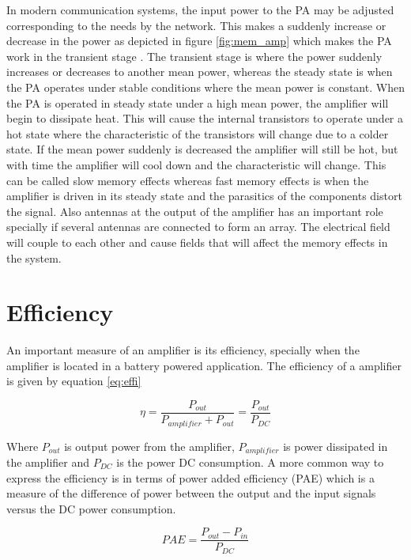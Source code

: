 In modern communication systems, the input power to the PA may be adjusted corresponding to the needs by the network. This makes a suddenly increase or decrease in the power as depicted in figure \ref{fig:mem_amp} which makes the PA work in the transient stage \citep{guo2015} \citep{liu2007}. The transient stage is where the power suddenly increases or decreases to another mean power, whereas the steady state is when the PA operates under stable conditions where the mean power is constant. When the PA is operated in steady state under a high mean power, the amplifier will begin to dissipate heat. This will cause the internal transistors to operate under a hot state where the characteristic of the transistors will change due to a colder state. If the mean power suddenly is decreased the amplifier will still be hot, but with time the amplifier will cool down and the characteristic will change. This can be called slow memory effects whereas fast memory effects is when the amplifier is driven in its steady state and the parasitics of the components distort the signal. Also antennas at the output of the amplifier has an important role specially if several antennas are connected to form an array. The electrical field will couple to each other and cause fields that will affect the memory effects in the system. 


\section{Efficiency}
An important measure of an amplifier is its efficiency, specially when the amplifier is located in a battery powered application. The efficiency of a amplifier is given by equation \ref{eq:effi}

\begin{equation} \label{eq:effi}
\eta = \frac{P_{out}}{P_{amplifier}+P_{out}} = \frac{P_{out}}{P_{DC}}
\end{equation}

Where $P_{out}$ is output power from the amplifier, $P_{amplifier}$ is power dissipated in the amplifier and $P_{DC}$ is the power DC consumption. A more common way to express the efficiency is in terms of power added efficiency (PAE) which is a measure of the difference of power between the output and the input signals versus the DC power consumption.

\begin{equation} \label{eq:effi2}
PAE = \frac{P_{out}-P_{in}}{P_{DC}}
\end{equation}
 


